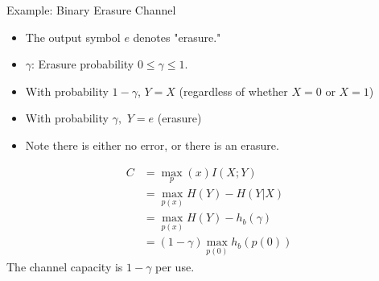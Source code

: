 \documentclass[../main.tex]{subfiles}
\begin{document}
\begin{pbox}{Example: Binary Erasure Channel}
\begin{center}
\end{center}
    \begin{itemize}
        \item The output symbol $e$ denotes "erasure."
        \item $\gamma$: Erasure probability $0\leq \gamma \leq 1$.
        \item With probability $1-\gamma$, $Y=X$ (regardless of whether $X=0$ or $X=1$)
        \item With probability $\gamma,$ $Y=e$ (erasure)
        \item Note there is either no error, or there is an erasure. 
    \end{itemize}
    \begin{align*}
        C&=\max_p(x) I(X;Y)\\
        &=\max_{p(x)}H(Y)-H(Y|X)\\
        &=\max_{p(x)}H(Y)-h_b(\gamma)\\
        &= (1-\gamma)\max_{p(0)}h_b(p(0))
    \end{align*}
    The channel capacity is $1-\gamma$ per use.
\end{pbox}
\end{document}
